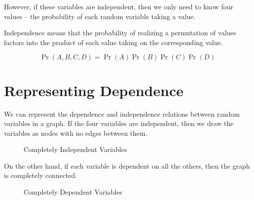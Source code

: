 \documentclass{article}
\begin{document}
However, if these variables are independent, then we only need to know
four values -- the probability of each random variable taking a value.

Independence means that the probability of realizing a permutation of
values factors into the product of each value taking on the
corresponding value.

\begin{equation}
\Pr(A,B,C,D) = \Pr(A)\Pr(B)\Pr(C)\Pr(D)
\end{equation}

\section*{Representing Dependence}

We can represent the dependence and independence relations between random
variables in a graph. If the four variables are independent, then we draw
the variables as nodes with no edges between them.


\begin{figure}[!ht]
\centering
{}
\caption{Completely Independent Variables}
\end{figure}

On the other hand, if each variable is dependent on all the others,
then the graph is completely connected. 

\begin{figure}
\centering
{}
\caption{Completely Dependent Variables}
\end{figure}
\end{document}
